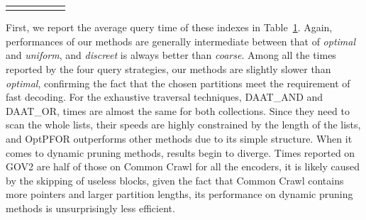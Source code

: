 \documentclass[runningheads,a4paper]{llncs}
\begin{document}
\begin{table}
\begin{tabular}{@{}ll*{4}{r}}
		\bottomrule
		\label{tab:efficiency}
	\end{tabular}
\end{table}

First, we report the average query time of these indexes in Table~\ref{tab:efficiency}.
Again, performances of our methods are generally intermediate between that of \textit{optimal} and \textit{uniform}, and \textit{discreet} is always better than \textit{coarse}.
Among all the times reported by the four query strategies, our methods are slightly slower than \textit{optimal}, confirming the fact that the chosen partitions meet the requirement of fast decoding.
For the exhaustive traversal techniques, DAAT\_AND and DAAT\_OR, times are almost the same for both collections.
Since they need to scan the whole lists, their speeds are highly constrained by the length of the lists, and OptPFOR outperforms other methods due to its simple structure.
When it comes to dynamic pruning methods, results begin to diverge.
Times reported on GOV2 are half of those on Common Crawl for all the encoders, it is likely caused by the skipping of useless blocks, given the fact that Common Crawl contains more pointers and larger partition lengths, its performance on dynamic pruning methods is unsurprisingly less efficient.
\end{document}
